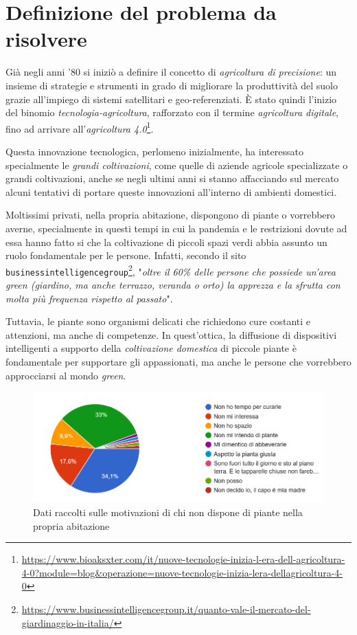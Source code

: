 \section{Definizione del problema da risolvere}

Già negli anni '80 si iniziò a definire il concetto di \textit{agricoltura di precisione}: un insieme di strategie e strumenti in grado di migliorare la produttività del suolo grazie all'impiego di sistemi satellitari e geo-referenziati. \`E stato quindi l'inizio del binomio \textit{tecnologia-agricoltura}, rafforzato con il termine \textit{agricoltura digitale}, fino ad arrivare all'\textit{agricoltura 4.0}\footnote{\url{https://www.bioaksxter.com/it/nuove-tecnologie-inizia-l-era-dell-agricoltura-4-0?module=blog&operazione=nuove-tecnologie-inizia-lera-dellagricoltura-4-0}}.

Questa innovazione tecnologica, perlomeno inizialmente, ha interessato specialmente le \textit{grandi coltivazioni}, come quelle di aziende agricole specializzate o grandi coltivazioni, anche se negli ultimi anni si stanno affacciando sul mercato alcuni tentativi di portare queste innovazioni all'interno di ambienti domestici.

Moltissimi privati, nella propria abitazione, dispongono di piante o vorrebbero averne, specialmente in questi tempi in cui la pandemia e le restrizioni dovute ad essa hanno fatto si che la coltivazione di piccoli spazi verdi abbia assunto un ruolo fondamentale per le persone. Infatti, secondo il sito \texttt{businessintelligencegroup}\footnote{\url{https://www.businessintelligencegroup.it/quanto-vale-il-mercato-del-giardinaggio-in-italia/}}, "\textit{oltre il 60\% delle persone che possiede un’area green (giardino, ma anche terrazzo, veranda o orto) la apprezza e la sfrutta con molta più frequenza rispetto al passato}".

Tuttavia, le piante sono organismi delicati che richiedono cure costanti e attenzioni, ma anche di competenze. In quest'ottica, la diffusione di dispositivi intelligenti a supporto della \textit{coltivazione domestica} di piccole piante è fondamentale per supportare gli appassionati, ma anche le persone che vorrebbero approcciarsi al mondo \textit{green}.

\begin{figure}[h!]
	\centering
	\includegraphics[width=\columnwidth]{images/torta_perche_no_piante.png}
	\caption{Dati raccolti sulle motivazioni di chi non dispone di piante nella propria abitazione}
	\label{fig:whynot}
\end{figure}

